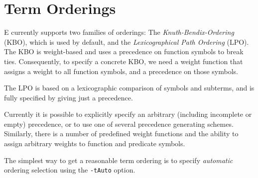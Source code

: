 \documentclass{report}
\begin{document}
\section{Term Orderings}
\label{sec:options:orderings}

E currently supports two families of orderings: The
\emph{Knuth-Bendix-Ordering} (KBO), which is used by default, and the
\emph{Lexicographical Path Ordering} (LPO). The KBO is weight-based
and uses a precedence on function symbols to break ties. Consequently,
to specify a concrete KBO, we need a weight function that assigns a
weight to all function symbols, and a precedence on those symbols.

The LPO is based on a lexicographic comparison of symbols and
subterms, and is fully specified by giving just a precedence.

Currently it is possible to explicitly specify an arbitrary (including
incomplete or empty) precedence, or to use one of several precedence
generating schemes. Similarly, there is a number of predefined weight
functions and the ability to assign arbitrary weights to function and
predicate symbols.

The simplest way to get a reasonable term ordering is to specify
\emph{automatic} ordering selection using the \texttt{-tAuto} option.
\end{document}
